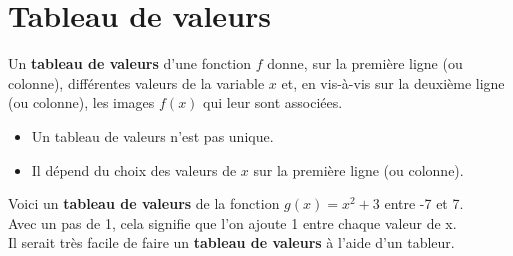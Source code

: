 \section{Tableau de valeurs}
\begin{definition}
    Un \textbf{tableau de valeurs} d'une fonction $f$ donne, sur la première ligne (ou colonne), différentes valeurs de la variable $x$ et, en vis-à-vis sur la deuxième ligne (ou colonne), les images $f(x)$ qui leur sont associées.
\end{definition}

\begin{remarques}
    \begin{itemize}
        \item Un tableau de valeurs n'est pas unique.
        \item Il dépend du choix des valeurs de $x$ sur la première ligne (ou colonne).
    \end{itemize}
\end{remarques}

\begin{exemple*1}
    Voici un \textbf{tableau de valeurs} de la fonction $g(x)=x^2+3$ entre -7 et 7.\\
    Avec un pas de 1, cela signifie que l'on ajoute 1 entre chaque valeur de x.\\
    Il serait très facile de faire un \textbf{tableau de valeurs} à l'aide d'un tableur.
        
\end{exemple*1}